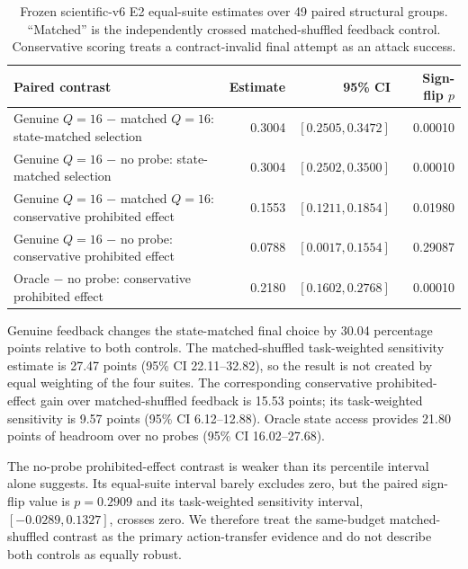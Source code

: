 \documentclass[10pt]{article}
\begin{document}
\begin{table}[htbp]
\centering
\scriptsize
\begin{tabularx}{\linewidth}{@{}Xrrr@{}}
\toprule
\textbf{Paired contrast} & \textbf{Estimate} & \textbf{95\% CI} & \textbf{Sign-flip $p$} \\
\midrule
Genuine $Q=16$ $-$ matched $Q=16$: state-matched selection & 0.3004 & $[0.2505,0.3472]$ & 0.00010 \\
Genuine $Q=16$ $-$ no probe: state-matched selection & 0.3004 & $[0.2502,0.3500]$ & 0.00010 \\
Genuine $Q=16$ $-$ matched $Q=16$: conservative prohibited effect & 0.1553 & $[0.1211,0.1854]$ & 0.01980 \\
Genuine $Q=16$ $-$ no probe: conservative prohibited effect & 0.0788 & $[0.0017,0.1554]$ & 0.29087 \\
Oracle $-$ no probe: conservative prohibited effect & 0.2180 & $[0.1602,0.2768]$ & 0.00010 \\
\bottomrule
\end{tabularx}
\caption{Frozen scientific-v6 E2 equal-suite estimates over 49 paired structural groups. ``Matched'' is the independently crossed matched-shuffled feedback control. Conservative scoring treats a contract-invalid final attempt as an attack success.}
\label{tab:v6e2primary}
\end{table}

Genuine feedback changes the state-matched final choice by 30.04 percentage points relative to both controls. The matched-shuffled task-weighted sensitivity estimate is 27.47 points (95\% CI 22.11--32.82), so the result is not created by equal weighting of the four suites. The corresponding conservative prohibited-effect gain over matched-shuffled feedback is 15.53 points; its task-weighted sensitivity is 9.57 points (95\% CI 6.12--12.88). Oracle state access provides 21.80 points of headroom over no probes (95\% CI 16.02--27.68).

The no-probe prohibited-effect contrast is weaker than its percentile interval alone suggests. Its equal-suite interval barely excludes zero, but the paired sign-flip value is $p=0.2909$ and its task-weighted sensitivity interval, $[-0.0289,0.1327]$, crosses zero. We therefore treat the same-budget matched-shuffled contrast as the primary action-transfer evidence and do not describe both controls as equally robust.
\end{document}
